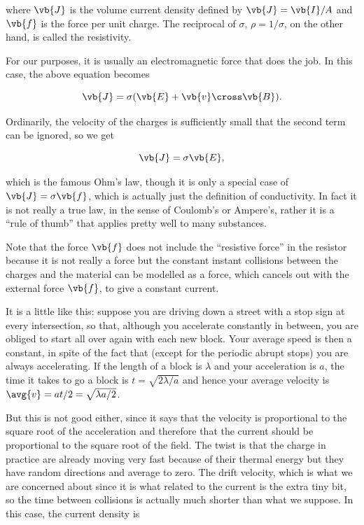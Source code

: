 \documentclass[english,a4paper,12pt]{report}
\begin{document}
where \(\vb{J} \) is the volume current density defined by \(\vb{J} = \vb{I} /A \) and \(\vb{f} \) is the force per unit charge. The reciprocal of \(\sigma \), \(\rho = 1 /\sigma  \), on the other hand, is called the resistivity.  

For our purposes, it is usually an electromagnetic force that does the job. In this case, the above equation becomes

\begin{equation}
    \vb{J} = \sigma (\vb{E} + \vb{v} \cross \vb{B} ).
\end{equation}

Ordinarily, the velocity of the charges is sufficiently small that the second term can be ignored, so we get

\begin{equation}
    \vb{J} = \sigma \vb{E} ,
\end{equation}

which is the famous Ohm's law, though it is only a special case of \(\vb{J} = \sigma \vb{f} \), which is actually just the definition of conductivity. In fact it is not really a true law, in the sense of Coulomb's or Ampere's, rather it is a ``rule of thumb'' that applies pretty well to many substances.

Note that the force \(\vb{f}\) does not include the ``resistive force'' in the resistor because it is not really a force but the constant instant collisions between the charges and the material can be modelled as a force, which cancels out with the external force \(\vb{f}\), to give a constant current.

It is a little like this: suppose you are driving down a street with a stop sign at every intersection, so that, although you accelerate constantly in between, you are obliged to start all over again with each new block. Your average speed is then a constant, in spite of the fact that (except for the periodic abrupt stops) you are always accelerating. If the length of a block is \(\lambda \)  and your acceleration is \(a\), the time it takes to go a block is \(t = \sqrt{2 \lambda /a} \) and hence your average velocity is \( \avg{v} =at /2 = \sqrt{\lambda a /2 }  \). 

But this is not good either, since it says that the velocity is proportional to the square root of the acceleration and therefore that the current should be proportional to the square root of the field. The twist is that the charge in practice are already moving very fast because of their thermal energy but they have random directions and average to zero. The drift velocity, which is what we are concerned about since it is what related to the current is the extra tiny bit, so the time between collisions is actually much shorter than what we suppose. In this case, the current density is
\end{document}
